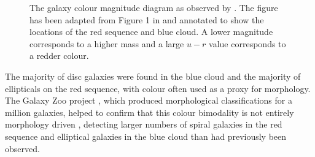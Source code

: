 \begin{figure}[t]
\caption[Galaxy Colour Magnitude Diagram from \cite{Baldry04}]{The galaxy colour magnitude diagram as observed by \cite{Baldry04}. The figure has been adapted from Figure 1 in \citeauthor{Baldry04} and annotated to show the locations of the red sequence and blue cloud. A lower magnitude corresponds to a higher mass and a large $u-r$ value corresponds to a redder colour.}
\label{fig:cmdbaldry}
\end{figure}


The majority of disc galaxies were found in the blue cloud and the majority of ellipticals on the red sequence, with colour often used as a proxy for morphology. The Galaxy Zoo project \citep{lintott08, Lintott11}, which produced morphological classifications for a million galaxies, helped to confirm that this colour bimodality is not entirely morphology driven \citep{Strat01, Salim07, Sch07, CHV08, Bamford09, Skibba09}, detecting larger numbers of spiral galaxies in the red sequence \citep{masters10c} and elliptical galaxies in the blue cloud \citep{Sch09} than had previously been observed.

